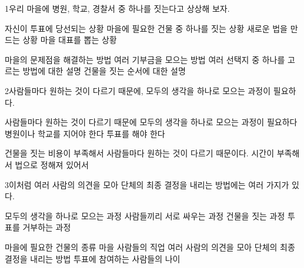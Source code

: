 \documentclass[fs85,seriesRus]{korfarm-base}
\begin{document}
\kfActivityBg \par{}
\par{}\par\nopagebreak[4]\smallskip\nopagebreak[4]
\kfBeginMC
\begin{kfSentenceUnit}{1}{우리 마을에 병원, 학교, 경찰서 중 하나를 짓는다고 상상해 보자.}
\begin{kfChoices}
\kfChoice 자신이 투표에 당선되는 상황
\kfChoice 마을에 필요한 건물 중 하나를 짓는 상황
\kfChoice 새로운 법을 만드는 상황
\kfChoice 마을 대표를 뽑는 상황
\end{kfChoices}
\begin{kfChoices}
\kfChoice 마을의 문제점을 해결하는 방법
\kfChoice 여러 기부금을 모으는 방법
\kfChoice 여러 선택지 중 하나를 고르는 방법에 대한 설명
\kfChoice 건물을 짓는 순서에 대한 설명
\end{kfChoices}
\end{kfSentenceUnit}

\begin{kfSentenceUnit}{2}{사람들마다 원하는 것이 다르기 때문에, 모두의 생각을 하나로 모으는 과정이 필요하다.}
\begin{kfChoices}
\kfChoice 사람들마다 원하는 것이 다르기 때문에
\kfChoice 모두의 생각을 하나로 모으는 과정이 필요하다
\kfChoice 병원이나 학교를 지어야 한다
\kfChoice 투표를 해야 한다
\end{kfChoices}
\begin{kfChoices}
\kfChoice 건물을 짓는 비용이 부족해서
\kfChoice 사람들마다 원하는 것이 다르기 때문이다.
\kfChoice 시간이 부족해서
\kfChoice 법으로 정해져 있어서
\end{kfChoices}
\end{kfSentenceUnit}

\begin{kfSentenceUnit}{3}{이처럼 여러 사람의 의견을 모아 단체의 최종 결정을 내리는 방법에는 여러 가지가 있다.}
\begin{kfChoices}
\kfChoice 모두의 생각을 하나로 모으는 과정
\kfChoice 사람들끼리 서로 싸우는 과정
\kfChoice 건물을 짓는 과정
\kfChoice 투표를 거부하는 과정
\end{kfChoices}
\begin{kfChoices}
\kfChoice 마을에 필요한 건물의 종류
\kfChoice 마을 사람들의 직업
\kfChoice 여러 사람의 의견을 모아 단체의 최종 결정을 내리는 방법
\kfChoice 투표에 참여하는 사람들의 나이
\end{kfChoices}
\end{kfSentenceUnit}
\end{document}
